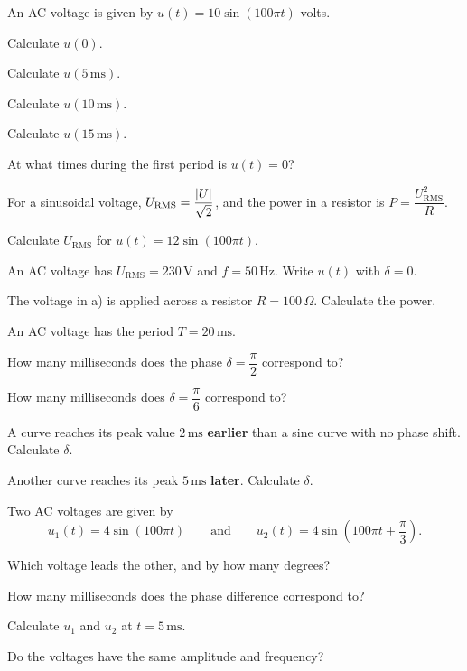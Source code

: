 An AC voltage is given by $u(t) = 10\sin(100\pi t)$ volts.
\begin{parts}
  \item Calculate $u(0)$.
  \item Calculate $u(5\,\text{ms})$.
  \item Calculate $u(10\,\text{ms})$.
  \item Calculate $u(15\,\text{ms})$.
  \item At what times during the first period is $u(t) = 0$?
\end{parts}

For a sinusoidal voltage, $U_{\text{RMS}} = \dfrac{\lvert U\rvert}{\sqrt{2}}$, and the power in a
resistor is $P = \dfrac{U_{\text{RMS}}^2}{R}$.
\begin{parts}
  \item Calculate $U_{\text{RMS}}$ for $u(t) = 12\sin(100\pi t)$.
  \item An AC voltage has $U_{\text{RMS}} = 230\,\text{V}$ and $f = 50\,\text{Hz}$. Write $u(t)$
    with $\delta = 0$.
  \item The voltage in a) is applied across a resistor $R = 100\,\Omega$. Calculate the power.
\end{parts}

An AC voltage has the period $T = 20\,\text{ms}$.
\begin{parts}
  \item How many milliseconds does the phase $\delta = \dfrac{\pi}{2}$ correspond to?
  \item How many milliseconds does $\delta = \dfrac{\pi}{6}$ correspond to?
  \item A curve reaches its peak value $2\,\text{ms}$ \textbf{earlier} than a sine curve with no
    phase shift. Calculate $\delta$.
  \item Another curve reaches its peak $5\,\text{ms}$ \textbf{later}. Calculate $\delta$.
\end{parts}

Two AC voltages are given by
\[
  u_1(t) = 4\sin(100\pi t) \qquad \text{and} \qquad
  u_2(t) = 4\sin\left(100\pi t + \frac{\pi}{3}\right).
\]
\begin{parts}
  \item Which voltage leads the other, and by how many degrees?
  \item How many milliseconds does the phase difference correspond to?
  \item Calculate $u_1$ and $u_2$ at $t = 5\,\text{ms}$.
  \item Do the voltages have the same amplitude and frequency?
\end{parts}

